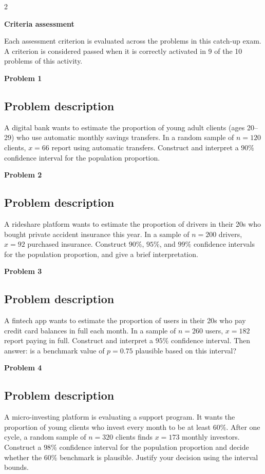 \documentclass[12pt]{article}
\newcommand{\SubsectionBox}[1]{%
\noindent\colorbox{gray!30}{\parbox{\linewidth}{\textbf{#1}}}\par\vspace{0.35cm}%
}
\begin{document}
\begin{multicols}{2}
	\SubsectionBox{Criteria assessment}\vspace{-0.25cm}
	Each assessment criterion is evaluated across the problems in this catch-up exam. A criterion is considered passed when it is correctly activated in 9 of the 10 problems of this activity.

	\vspace{0.25cm}
\SubsectionBox{Problem 1}
\subsection*{Problem description}
A digital bank wants to estimate the proportion of young adult clients (ages 20--29) who use automatic monthly savings transfers. In a random sample of \(n=120\) clients, \(x=66\) report using automatic transfers. Construct and interpret a \(90\%\) confidence interval for the population proportion.

\vspace{0.5cm}
\SubsectionBox{Problem 2}
\subsection*{Problem description}
A rideshare platform wants to estimate the proportion of drivers in their 20s who bought private accident insurance this year. In a sample of \(n=200\) drivers, \(x=92\) purchased insurance. Construct \(90\%\), \(95\%\), and \(99\%\) confidence intervals for the population proportion, and give a brief interpretation.

\vspace{0.5cm}
\SubsectionBox{Problem 3}
\subsection*{Problem description}
A fintech app wants to estimate the proportion of users in their 20s who pay credit card balances in full each month. In a sample of \(n=260\) users, \(x=182\) report paying in full. Construct and interpret a \(95\%\) confidence interval. Then answer: is a benchmark value of \(p=0.75\) plausible based on this interval?

\vspace{0.5cm}
\SubsectionBox{Problem 4}
\subsection*{Problem description}
A micro-investing platform is evaluating a support program. It wants the proportion of young clients who invest every month to be at least \(60\%\). After one cycle, a random sample of \(n=320\) clients finds \(x=173\) monthly investors. Construct a \(98\%\) confidence interval for the population proportion and decide whether the \(60\%\) benchmark is plausible. Justify your decision using the interval bounds.


\end{multicols}
\end{document}
